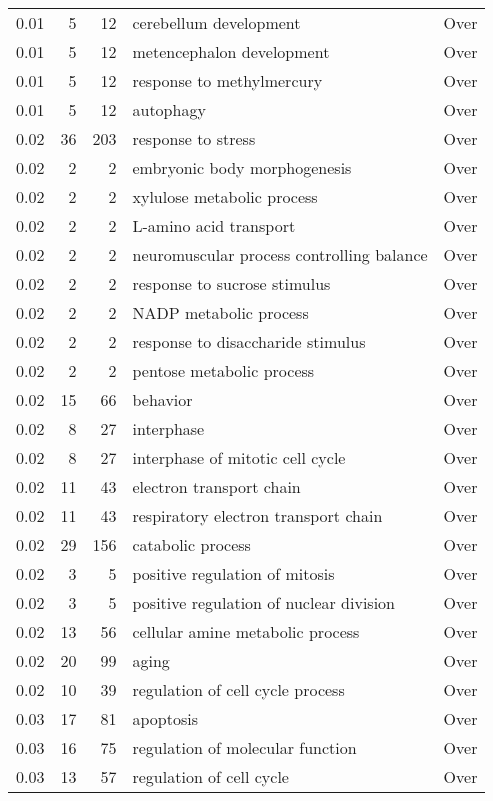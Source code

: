 \begin{longtable}{rrrp{7cm}r}
  0.01 &   5 &  12 & cerebellum development & Over \\ 
  0.01 &   5 &  12 & metencephalon development & Over \\ 
  0.01 &   5 &  12 & response to methylmercury & Over \\ 
  0.01 &   5 &  12 & autophagy & Over \\ 
  0.02 &  36 & 203 & response to stress & Over \\ 
  0.02 &   2 &   2 & embryonic body morphogenesis & Over \\ 
  0.02 &   2 &   2 & xylulose metabolic process & Over \\ 
  0.02 &   2 &   2 & L-amino acid transport & Over \\ 
  0.02 &   2 &   2 & neuromuscular process controlling balance & Over \\ 
  0.02 &   2 &   2 & response to sucrose stimulus & Over \\ 
  0.02 &   2 &   2 & NADP metabolic process & Over \\ 
  0.02 &   2 &   2 & response to disaccharide stimulus & Over \\ 
  0.02 &   2 &   2 & pentose metabolic process & Over \\ 
  0.02 &  15 &  66 & behavior & Over \\ 
  0.02 &   8 &  27 & interphase & Over \\ 
  0.02 &   8 &  27 & interphase of mitotic cell cycle & Over \\ 
  0.02 &  11 &  43 & electron transport chain & Over \\ 
  0.02 &  11 &  43 & respiratory electron transport chain & Over \\ 
  0.02 &  29 & 156 & catabolic process & Over \\ 
  0.02 &   3 &   5 & positive regulation of mitosis & Over \\ 
  0.02 &   3 &   5 & positive regulation of nuclear division & Over \\ 
  0.02 &  13 &  56 & cellular amine metabolic process & Over \\ 
  0.02 &  20 &  99 & aging & Over \\ 
  0.02 &  10 &  39 & regulation of cell cycle process & Over \\ 
  0.03 &  17 &  81 & apoptosis & Over \\ 
  0.03 &  16 &  75 & regulation of molecular function & Over \\ 
  0.03 &  13 &  57 & regulation of cell cycle & Over \\ 

\end{longtable}
